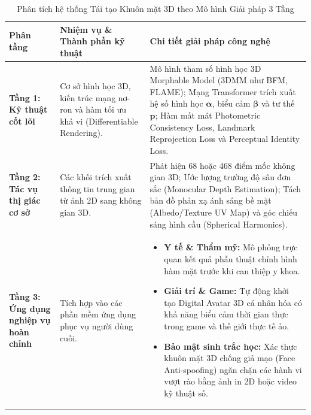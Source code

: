 \begin{table}[H]
\centering
\small
\caption{Phân tích hệ thống Tái tạo Khuôn mặt 3D theo Mô hình Giải pháp 3 Tầng}
\label{tab:three_tier_3d_face}
\renewcommand{\arraystretch}{1.3}
\begin{tabularx}{\textwidth}{|p{2.8cm}|X|X|}
\hline
\textbf{Phân tầng} & \textbf{Nhiệm vụ \& Thành phần kỹ thuật} & \textbf{Chi tiết giải pháp công nghệ} \\
\hline
\textbf{Tầng 1: Kỹ thuật cốt lõi} & Cơ sở hình học 3D, kiến trúc mạng nơ-ron và hàm tối ưu khả vi (Differentiable Rendering). & Mô hình tham số hình học 3D Morphable Model (3DMM như BFM, FLAME); Mạng Transformer trích xuất hệ số hình học $\boldsymbol{\alpha}$, biểu cảm $\boldsymbol{\beta}$ và tư thế $\mathbf{p}$; Hàm mất mát Photometric Consistency Loss, Landmark Reprojection Loss và Perceptual Identity Loss. \\
\hline
\textbf{Tầng 2: Tác vụ thị giác cơ sở} & Các khối trích xuất thông tin trung gian từ ảnh 2D sang không gian 3D. & Phát hiện 68 hoặc 468 điểm mốc không gian 3D; Ước lượng trường độ sâu đơn sắc (Monocular Depth Estimation); Tách bản đồ phản xạ ánh sáng bề mặt (Albedo/Texture UV Map) và góc chiếu sáng hình cầu (Spherical Harmonics). \\
\hline
\textbf{Tầng 3: Ứng dụng nghiệp vụ hoàn chỉnh} & Tích hợp vào các phần mềm ứng dụng phục vụ người dùng cuối. & \begin{itemize}[leftmargin=*,noitemsep,topsep=0pt]
    \item \textbf{Y tế \& Thẩm mỹ:} Mô phỏng trực quan kết quả phẫu thuật chỉnh hình hàm mặt trước khi can thiệp y khoa.
    \item \textbf{Giải trí \& Game:} Tự động khởi tạo Digital Avatar 3D cá nhân hóa có khả năng biểu cảm thời gian thực trong game và thế giới thực tế ảo.
    \item \textbf{Bảo mật sinh trắc học:} Xác thực khuôn mặt 3D chống giả mạo (Face Anti-spoofing) ngăn chặn các hành vi vượt rào bằng ảnh in 2D hoặc video kỹ thuật số.
\end{itemize} \\
\hline
\end{tabularx}
\end{table}

